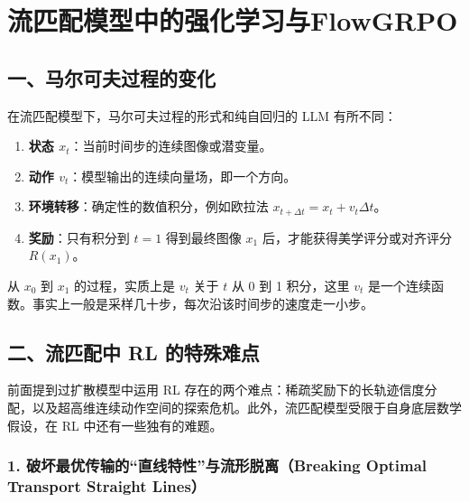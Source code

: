 \setcounter{section}{2}

\hypertarget{ux6d41ux5339ux914dux6a21ux578bux4e2dux7684ux5f3aux5316ux5b66ux4e60ux4e0eflowgrpo}{%
\section{流匹配模型中的强化学习与FlowGRPO}\label{ux6d41ux5339ux914dux6a21ux578bux4e2dux7684ux5f3aux5316ux5b66ux4e60ux4e0eflowgrpo}}

\hypertarget{ux4e00ux9a6cux5c14ux53efux592bux8fc7ux7a0bux7684ux53d8ux5316}{%
\subsection{一、马尔可夫过程的变化}\label{ux4e00ux9a6cux5c14ux53efux592bux8fc7ux7a0bux7684ux53d8ux5316}}

在流匹配模型下，马尔可夫过程的形式和纯自回归的 LLM 有所不同：

\begin{enumerate}
\def\labelenumi{\arabic{enumi}.}
\tightlist
\item
  \textbf{状态 \(x_t\)}：当前时间步的连续图像或潜变量。
\item
  \textbf{动作 \(v_t\)}：模型输出的连续向量场，即一个方向。
\item
  \textbf{环境转移}：确定性的数值积分，例如欧拉法 \(x_{t+\Delta t}=x_t+v_t\Delta t\)。
\item
  \textbf{奖励}：只有积分到 \(t=1\) 得到最终图像 \(x_1\) 后，才能获得美学评分或对齐评分 \(R(x_1)\)。
\end{enumerate}

从 \(x_0\) 到 \(x_1\) 的过程，实质上是 \(v_t\) 关于 \(t\) 从 0 到 1 积分，这里 \(v_t\) 是一个连续函数。事实上一般是采样几十步，每次沿该时间步的速度走一小步。

\hypertarget{ux4e8cux6d41ux5339ux914dux4e2d-rl-ux7684ux7279ux6b8aux96beux70b9}{%
\subsection{二、流匹配中 RL 的特殊难点}\label{ux4e8cux6d41ux5339ux914dux4e2d-rl-ux7684ux7279ux6b8aux96beux70b9}}

前面提到过扩散模型中运用 RL 存在的两个难点：稀疏奖励下的长轨迹信度分配，以及超高维连续动作空间的探索危机。此外，流匹配模型受限于自身底层数学假设，在 RL 中还有一些独有的难题。

\hypertarget{ux7834ux574fux6700ux4f18ux4f20ux8f93ux7684ux76f4ux7ebfux7279ux6027ux4e0eux6d41ux5f62ux8131ux79bbbreaking-optimal-transport-straight-lines}{%
\subsubsection{1. 破坏最优传输的``直线特性''与流形脱离（Breaking Optimal Transport Straight Lines）}\label{ux7834ux574fux6700ux4f18ux4f20ux8f93ux7684ux76f4ux7ebfux7279ux6027ux4e0eux6d41ux5f62ux8131ux79bbbreaking-optimal-transport-straight-lines}}

